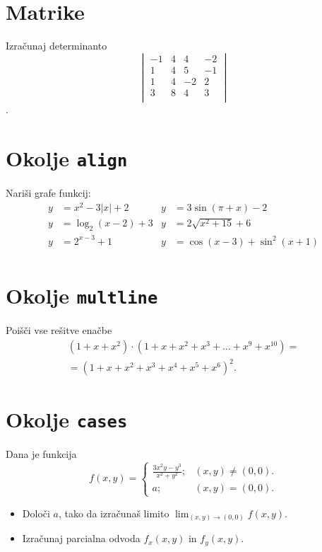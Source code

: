 \documentclass[a4paper,12pt]{article}
\begin{document}
\section*{Matrike}
Izračunaj determinanto
\[\begin{vmatrix}
-1 & 4 & 4 & -2 \\
1 & 4 & 5 & -1 \\
1 & 4 & -2 & 2 \\
3 & 8 & 4 & 3 \\
\end{vmatrix} \].
\section*{Okolje \texttt{align}}
Nariši grafe funkcij:
\begin{align*}
y &= x^2 - 3|x| + 2  &  y &= 3 \sin(\pi+x) - 2 \\
y &= \log_2(x-2) + 3 &  y &= 2 \sqrt{x^2+15} + 6 \\
y &= 2^{x-3} + 1     &  y &= \cos(x-3) + \sin^2(x+1) \\
\end{align*}

\section*{Okolje \texttt{multline}}
Poišči vse rešitve enačbe
\begin{multline*}
(1+x+x^2) \cdot (1+x+x^2+x^3+\ldots+x^9+x^{10}) =\\
=(1+x+x^2+x^3+x^4+x^5+x^6)^2.
\end{multline*}

\section*{Okolje \texttt{cases}}
Dana je funkcija
\begin{equation*}
   f(x,y) =
   \begin{cases}
      \frac{3x^2y-y^3}{x^2+y^2}; &(x,y) \neq (0,0). \\
      {a}; &(x,y) = (0,0).
   \end{cases}
\end{equation*}
   
\begin{itemize}
\item Določi \(a\), tako da izračunaš limito \( \lim_{(x,y)\to(0,0)} f(x,y) \).
\item Izračunaj parcialna odvoda \(f_x(x,y)\) in \(f_y(x,y)\).
\end{itemize}
\end{document}
